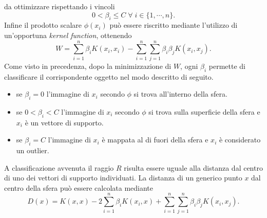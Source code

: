 \documentclass [11pt,a4paper,twoside,openright] {book}
\begin{document}
da ottimizzare rispettando i vincoli
\begin{equation}
0 < \beta_i \leq C \; \forall \; i \in \lbrace 1, \cdots, n \rbrace.
\end{equation}
Infine il prodotto scalare $\phi(x_i)$ può essere riscritto mediante l'utilizzo di un'opportuna \textit{kernel function}, ottenendo
\begin{equation}
W = \sum_{i=1}^n\beta_iK(x_i,x_i) - \sum_{i=1}^n\sum_{j=1}^n\beta_i\beta_jK(x_i,x_j).
\end{equation}
Come visto in precedenza, dopo la minimizzazione di $W$, ogni $\beta_i$ permette di classificare il corrispondente oggetto nel modo descritto di seguito.
\begin{itemize}
\item[]se $\beta_i=0$ l'immagine di $x_i$ secondo $\phi$ si trova all'interno della sfera.
\item[]se $0 < \beta_i < C$ l'immagine di $x_i$ secondo $\phi$ si trova sulla superficie della sfera e $x_i$ è un vettore di supporto.
\item[]se $\beta_i=C$ l'immagine di $x_i$ è mappata al di fuori della sfera e $x_i$ è considerato un outlier.
\end{itemize}
A classificazione avvenuta il raggio $R$ risulta essere uguale alla distanza dal centro di uno dei vettori di supporto individuati. La distanza di un generico punto $x$ dal centro della sfera può essere calcolata mediante
\begin{equation}
D(x) = K(x,x) - 2 \sum_{i=1}^n \beta_i K(x_i,x) + \sum_{i=1}^n\sum_{j=1}^n\beta_i\beta_jK(x_i,x_j).
\end{equation}
\end{document}
